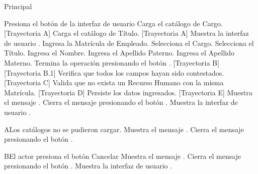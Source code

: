 \begin{UCtrayectoria}{Principal}

    \UCpaso[\UCactor] Presiona el botón  de la interfaz de usuario 
    \UCpaso Carga el catálogo de Cargo. [Trayectoria A]
    \UCpaso Carga el catálogo de Título. [Trayectoria A]
    \UCpaso Muestra la interfaz de usuario .
    \UCpaso[\UCactor] Ingresa la Matrícula de Empleado.
    \UCpaso[\UCactor] Selecciona el Cargo.
    \UCpaso[\UCactor] Selecciona el Título.
    \UCpaso[\UCactor] Ingresa el Nombre.
    \UCpaso[\UCactor] Ingresa el Apellido Paterno.
    \UCpaso[\UCactor] Ingresa el Apellido Materno.
    \UCpaso[\UCactor] Termina la operación presionando el botón . [Trayectoria B] [Trayectoria B.1]
    \UCpaso Verifica que todos los campos hayan sido contestados. [Trayectoria C]
    \UCpaso Valida que no exista un Recurso Humano con la misma Matrícula. [Trayectoria D]
    \UCpaso Persiste los datos ingresados. [Trayectoria E]
    \UCpaso Muestra el mensaje .
    \UCpaso[\UCactor] Cierra el mensaje presionando el botón .
    \UCpaso Muestra la interfaz de usuario .
\end{UCtrayectoria}


\begin{UCtrayectoriaA}{A}{Los catálogos no se pudieron cargar.}
    \UCpaso Muestra el mensaje .
    \UCpaso[\UCactor] Cierra el mensaje presionando el botón .
\end{UCtrayectoriaA}


\begin{UCtrayectoriaA}{B}{El actor presiona el botón Cancelar}
    \UCpaso Muestra el mensaje .
    \UCpaso[\UCactor] Cierra el mensaje presionando el botón .
    \UCpaso Muestra la interfaz de usuario .
\end{UCtrayectoriaA}

